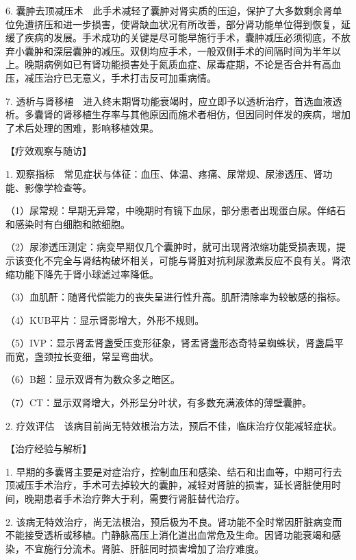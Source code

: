 6.
囊肿去顶减压术　此手术减轻了囊肿对肾实质的压迫，保护了大多数剩余肾单位免遭挤压和进一步损害，使肾缺血状况有所改善，部分肾功能单位得到恢复，延缓了疾病的发展。手术成功的关键是尽可能早施行手术，囊肿减压必须彻底，不放弃小囊肿和深层囊肿的减压。双侧均应手术，一般双侧手术的间隔时间为半年以上。晚期病例如已有肾功能损害处于氮质血症、尿毒症期，不论是否合并有高血压，减压治疗已无意义，手术打击反可加重病情。

7.
透析与肾移植　进入终末期肾功能衰竭时，应立即予以透析治疗，首选血液透析。多囊肾的肾移植生存率与其他原因而施术者相仿，但因同时伴发的疾病，增加了术后处理的困难，影响移植效果。

【疗效观察与随访】

1.
观察指标　常见症状与体征：血压、体温、疼痛、尿常规、尿渗透压、肾功能、影像学检查等。

（1）尿常规：早期无异常，中晚期时有镜下血尿，部分患者出现蛋白尿。伴结石和感染时有白细胞和脓细胞。

（2）尿渗透压测定：病变早期仅几个囊肿时，就可出现肾浓缩功能受损表现，提示该变化不完全与肾结构破坏相关，可能与肾脏对抗利尿激素反应不良有关。肾浓缩功能下降先于肾小球滤过率降低。

（3）血肌酐：随肾代偿能力的丧失呈进行性升高。肌酐清除率为较敏感的指标。

（4）KUB平片：显示肾影增大，外形不规则。

（5）IVP：显示肾盂肾盏受压变形征象，肾盂肾盏形态奇特呈蜘蛛状，肾盏扁平而宽，盏颈拉长变细，常呈弯曲状。

（6）B超：显示双肾有为数众多之暗区。

（7）CT：显示双肾增大，外形呈分叶状，有多数充满液体的薄壁囊肿。

2. 疗效评估　该病目前尚无特效根治方法，预后不佳，临床治疗仅能减轻症状。

【治疗经验与解析】

1.
早期的多囊肾主要是对症治疗，控制血压和感染、结石和出血等，中期可行去顶减压手术治疗，手术可去掉较大的囊肿，减轻对肾脏的损害，延长肾脏使用时间，晚期患者手术治疗弊大于利，需要行肾脏替代治疗。

2.
该病无特效治疗，尚无法根治，预后极为不良。肾功能不全时常因肝脏病变而不能接受透析或移植。门静脉高压上消化道出血常危及生命。因肾功能衰竭和感染，不宜施行分流术。肾脏、肝脏同时损害增加了治疗难度。
